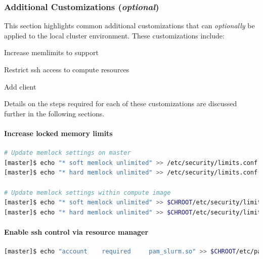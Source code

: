 \documentclass[letterpaper]{article}
\begin{document}
\subsubsection{Additional Customizations ({\em optional})} \label{sec:addl_customizations}

This section highlights common additional customizations that
can {\em optionally} be applied to the
local cluster environment. These customizations include:

\begin{itemize*}
\item Increase memlimits to support \InfiniBand{}
\item Restrict ssh access to compute resources
\item Add \Lustre{} client
\end{itemize*}

\noindent Details on the steps required for each of these customizations are
discussed further in the following sections.

\paragraph{Increase locked memory limits}

 

\begin{lstlisting}[language=bash,keywords={},upquote=true]
# Update memlock settings on master
[master]$ echo "* soft memlock unlimited" >> /etc/security/limits.conf
[master]$ echo "* hard memlock unlimited" >> /etc/security/limits.conf

# Update memlock settings within compute image
[master]$ echo "* soft memlock unlimited" >> $CHROOT/etc/security/limits.conf
[master]$ echo "* hard memlock unlimited" >> $CHROOT/etc/security/limits.conf
\end{lstlisting}


\paragraph{Enable ssh control via resource manager} 



\begin{lstlisting}[language=bash,keywords={},upquote=true]
[master]$ echo "account    required     pam_slurm.so" >> $CHROOT/etc/pam.d/sshd
\end{lstlisting}
\end{document}
